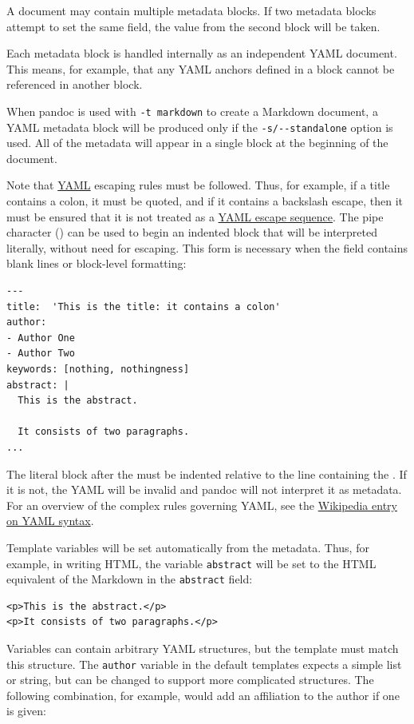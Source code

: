 \documentclass[
]{article}
\begin{document}
A document may contain multiple metadata blocks. If two metadata blocks
attempt to set the same field, the value from the second block will be
taken.

Each metadata block is handled internally as an independent YAML
document. This means, for example, that any YAML anchors defined in a
block cannot be referenced in another block.

When pandoc is used with \texttt{-t\ markdown} to create a Markdown
document, a YAML metadata block will be produced only if the
\texttt{-s/-\/-standalone} option is used. All of the metadata will
appear in a single block at the beginning of the document.

Note that \href{https://yaml.org/spec/1.2/spec.html}{YAML} escaping
rules must be followed. Thus, for example, if a title contains a colon,
it must be quoted, and if it contains a backslash escape, then it must
be ensured that it is not treated as a
\href{https://yaml.org/spec/1.2/spec.html\#id2776092}{YAML escape
sequence}. The pipe character (\texttt{\textbar{}}) can be used to begin
an indented block that will be interpreted literally, without need for
escaping. This form is necessary when the field contains blank lines or
block-level formatting:

\begin{verbatim}
---
title:  'This is the title: it contains a colon'
author:
- Author One
- Author Two
keywords: [nothing, nothingness]
abstract: |
  This is the abstract.

  It consists of two paragraphs.
...
\end{verbatim}

The literal block after the \texttt{\textbar{}} must be indented
relative to the line containing the \texttt{\textbar{}}. If it is not,
the YAML will be invalid and pandoc will not interpret it as metadata.
For an overview of the complex rules governing YAML, see the
\href{https://en.wikipedia.org/wiki/YAML\#Syntax}{Wikipedia entry on
YAML syntax}.

Template variables will be set automatically from the metadata. Thus,
for example, in writing HTML, the variable \texttt{abstract} will be set
to the HTML equivalent of the Markdown in the \texttt{abstract} field:

\begin{verbatim}
<p>This is the abstract.</p>
<p>It consists of two paragraphs.</p>
\end{verbatim}

Variables can contain arbitrary YAML structures, but the template must
match this structure. The \texttt{author} variable in the default
templates expects a simple list or string, but can be changed to support
more complicated structures. The following combination, for example,
would add an affiliation to the author if one is given:
\end{document}
